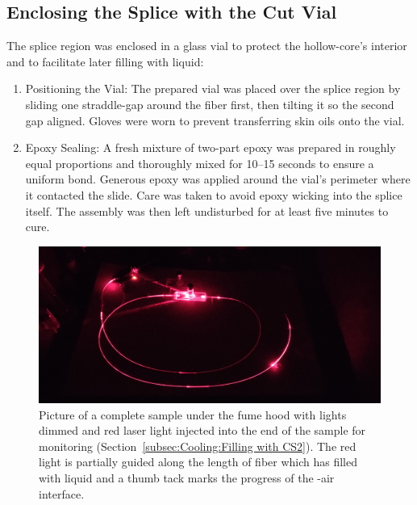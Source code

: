 \subsection{Enclosing the Splice with the Cut Vial}
\label{subsec:Cooling:Enclosing the Splice}

The splice region was enclosed in a glass vial to protect the hollow-core’s interior and to facilitate later filling with liquid:

\begin{enumerate}
	\item Positioning the Vial: The prepared vial was placed over the splice region by sliding one straddle-gap around the fiber first, then tilting it so the second gap aligned. Gloves were worn to prevent transferring skin oils onto the vial.
	\item Epoxy Sealing: A fresh mixture of two-part epoxy was prepared in roughly equal proportions and thoroughly mixed for 10–15 seconds to ensure a uniform bond. Generous epoxy was applied around the vial’s perimeter where it contacted the slide. Care was taken to avoid epoxy wicking into the splice itself. The assembly was then left undisturbed for at least five minutes to cure.
\end{enumerate}

\begin{figure}[t]
  \centering
  \includegraphics[width=\textwidth]{figs/3-Cooling/redLightWithThumbTackWholeSample.jpg}
  \caption{Picture of a complete sample under the fume hood with lights dimmed and red laser light injected into the end of the sample for monitoring (Section~\ref{subsec:Cooling:Filling with CS2}). The red light is partially guided along the length of fiber which has filled with liquid  and a thumb tack marks the progress of the -air interface.}
  \label{fig:red Light with Thumb Tack Whole Sample}
\end{figure}

